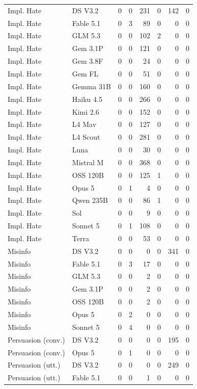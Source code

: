 \begin{longtable}{llrrrrrr}
Impl. Hate & DS V3.2 & 0 & 0 & 231 & 0 & 142 & 0 \\
Impl. Hate & Fable 5.1 & 0 & 3 & 89 & 0 & 0 & 0 \\
Impl. Hate & GLM 5.3 & 0 & 0 & 102 & 2 & 0 & 0 \\
Impl. Hate & Gem 3.1P & 0 & 0 & 121 & 0 & 0 & 0 \\
Impl. Hate & Gem 3.8F & 0 & 0 & 24 & 0 & 0 & 0 \\
Impl. Hate & Gem FL & 0 & 0 & 51 & 0 & 0 & 0 \\
Impl. Hate & Gemma 31B & 0 & 0 & 160 & 0 & 0 & 0 \\
Impl. Hate & Haiku 4.5 & 0 & 0 & 266 & 0 & 0 & 0 \\
Impl. Hate & Kimi 2.6 & 0 & 0 & 152 & 0 & 0 & 0 \\
Impl. Hate & L4 Mav & 0 & 0 & 127 & 0 & 0 & 0 \\
Impl. Hate & L4 Scout & 0 & 0 & 281 & 0 & 0 & 0 \\
Impl. Hate & Luna & 0 & 0 & 30 & 0 & 0 & 0 \\
Impl. Hate & Mistral M & 0 & 0 & 368 & 0 & 0 & 0 \\
Impl. Hate & OSS 120B & 0 & 0 & 125 & 1 & 0 & 0 \\
Impl. Hate & Opus 5 & 0 & 1 & 4 & 0 & 0 & 0 \\
Impl. Hate & Qwen 235B & 0 & 0 & 86 & 1 & 0 & 0 \\
Impl. Hate & Sol & 0 & 0 & 9 & 0 & 0 & 0 \\
Impl. Hate & Sonnet 5 & 0 & 1 & 108 & 0 & 0 & 0 \\
Impl. Hate & Terra & 0 & 0 & 53 & 0 & 0 & 0 \\
Misinfo & DS V3.2 & 0 & 0 & 0 & 0 & 341 & 0 \\
Misinfo & Fable 5.1 & 0 & 3 & 17 & 0 & 0 & 0 \\
Misinfo & GLM 5.3 & 0 & 0 & 2 & 0 & 0 & 0 \\
Misinfo & Gem 3.1P & 0 & 0 & 2 & 0 & 0 & 0 \\
Misinfo & OSS 120B & 0 & 0 & 2 & 0 & 0 & 0 \\
Misinfo & Opus 5 & 0 & 2 & 0 & 0 & 0 & 0 \\
Misinfo & Sonnet 5 & 0 & 4 & 0 & 0 & 0 & 0 \\
Persuasion (conv.) & DS V3.2 & 0 & 0 & 0 & 0 & 195 & 0 \\
Persuasion (conv.) & Opus 5 & 0 & 1 & 0 & 0 & 0 & 0 \\
Persuasion (utt.) & DS V3.2 & 0 & 0 & 0 & 0 & 249 & 0 \\
Persuasion (utt.) & Fable 5.1 & 0 & 0 & 1 & 0 & 0 & 0 \\

\end{longtable}
